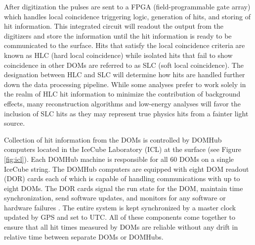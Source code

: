 \documentclass{gatech-thesis}
\begin{document}
After digitization the pulses are sent to a FPGA (field-programmable gate array) which handles local coincidence triggering logic, generation of hits, and storing of hit information. This integrated circuit will readout the output from the digitizers and store the information until the hit information is ready to be communicated to the surface. Hits that satisfy the local coincidence criteria are known as HLC (hard local coincidence) while isolated hits that fail to show coincidence in other DOMs are referred to as SLC (soft local coincidence). The designation between HLC and SLC will determine how hits are handled further down the data processing pipeline. While some analyses prefer to work solely in the realm of HLC hit information to minimize the contribution of background effects, many reconstruction algorithms and low-energy analyses will favor the inclusion of SLC hits as they may represent true physics hits from a fainter light source.

Collection of hit information from the DOMs is controlled by DOMHub computers located in the IceCube Laboratory (ICL) at the surface (see Figure \ref{fig:icl}). Each DOMHub machine is responsible for all 60 DOMs on a single IceCube string. The DOMHub computers are equipped with eight DOM readout (DOR) cards each of which is capable of handling communications with up to eight DOMs. The DOR cards signal the run state for the DOM, maintain time synchronization, send software updates, and monitors for any software or hardware failures \cite{2009NIMPA.601..294A}. The entire system is kept synchronized by a master clock updated by GPS and set to UTC. All of these components come together to ensure that all hit times measured by DOMs are reliable without any drift in relative time between separate DOMs or DOMHubs.
\end{document}
